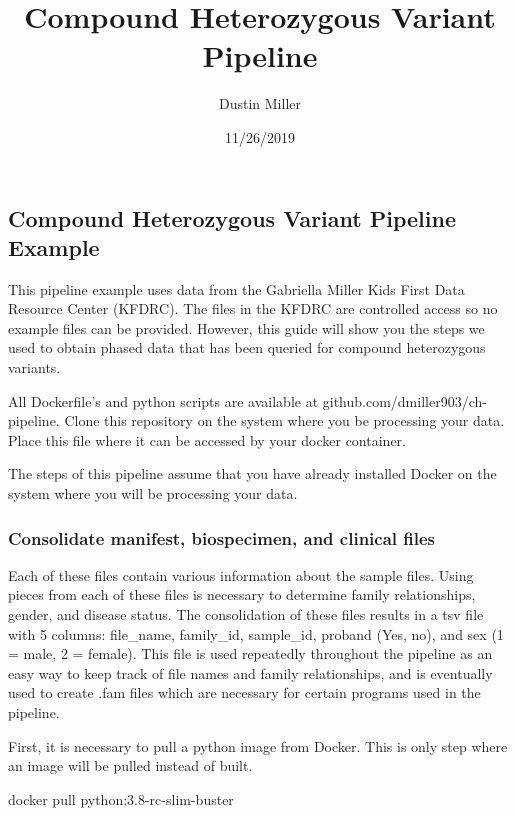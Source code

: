 \documentclass[]{article}
\title{Compound Heterozygous Variant Pipeline}
\author{Dustin Miller}
\date{11/26/2019}
\newenvironment{Shaded}{\begin{snugshade}}{\end{snugshade}}
\newcommand{\ExtensionTok}[1]{#1}
\newcommand{\NormalTok}[1]{#1}
\begin{document}
\maketitle

\hypertarget{compound-heterozygous-variant-pipeline-example}{%
\subsection{Compound Heterozygous Variant Pipeline
Example}\label{compound-heterozygous-variant-pipeline-example}}

This pipeline example uses data from the Gabriella Miller Kids First
Data Resource Center (KFDRC). The files in the KFDRC are controlled
access so no example files can be provided. However, this guide will
show you the steps we used to obtain phased data that has been queried
for compound heterozygous variants.

All Dockerfile's and python scripts are available at
github.com/dmiller903/ch-pipeline. Clone this repository on the system
where you be processing your data. Place this file where it can be
accessed by your docker container.

The steps of this pipeline assume that you have already installed Docker
on the system where you will be processing your data.

\hypertarget{consolidate-manifest-biospecimen-and-clinical-files}{%
\subsubsection{Consolidate manifest, biospecimen, and clinical
files}\label{consolidate-manifest-biospecimen-and-clinical-files}}

Each of these files contain various information about the sample files.
Using pieces from each of these files is necessary to determine family
relationships, gender, and disease status. The consolidation of these
files results in a tsv file with 5 columns: file\_name, family\_id,
sample\_id, proband (Yes, no), and sex (1 = male, 2 = female). This file
is used repeatedly throughout the pipeline as an easy way to keep track
of file names and family relationships, and is eventually used to create
.fam files which are necessary for certain programs used in the
pipeline.

First, it is necessary to pull a python image from Docker. This is only
step where an image will be pulled instead of built.

\begin{Shaded}
\begin{Highlighting}[]
\ExtensionTok{docker}\NormalTok{ pull python:3.8-rc-slim-buster}
\end{Highlighting}
\end{Shaded}
\end{document}
